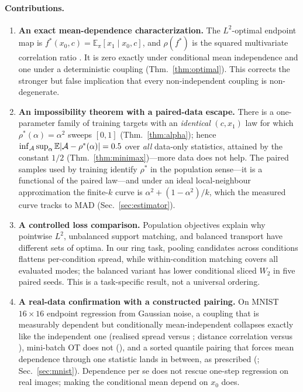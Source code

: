 \documentclass{article}
\theoremstyle{plain}
\newcommand{\Eop}{\mathbb{E}}
\begin{document}
\paragraph{Contributions.}
\begin{enumerate}
\item[\textbf{C1}] \textbf{An exact mean-dependence characterization.} The $L^2$-optimal
endpoint map is $f^\ast(x_0,c)=\Eop_\pi[x_1\mid x_0,c]$, and $\rho(f^\ast)$ is the
squared multivariate correlation ratio \citep{renyi1959,sampson1984}. It is zero exactly
under conditional mean independence and one under a deterministic coupling
(Thm.~\ref{thm:optimal}). This corrects the stronger but false implication that every
non-independent coupling is non-degenerate.
\item[\textbf{C2}] \textbf{An impossibility theorem with a paired-data escape.} There is a
one-parameter family of training targets with an \emph{identical} $(c,x_1)$ law for
which $\rho^\ast(\alpha)=\alpha^2$ sweeps $[0,1]$ (Thm.~\ref{thm:alpha}); hence
$\inf_{\mathcal A}\sup_\alpha\Eop|\mathcal A-\rho^\ast(\alpha)|=\MinimaxConst$ over
\emph{all} data-only statistics, attained by the constant $1/2$
(Thm.~\ref{thm:minimax})---more data does not help. The paired samples used by
training identify $\rho^\ast$ in the population sense---it is a functional of the paired
law---and under an ideal local-neighbour approximation the finite-$k$ curve is
$\alpha^2+(1-\alpha^2)/k$, which the measured curve tracks to MAD \ImpPredMad{}
(Sec.~\ref{sec:estimator}).
\item[\textbf{C3}] \textbf{A controlled loss comparison.} Population objectives explain
why pointwise $L^2$, unbalanced support matching, and balanced transport have different
sets of optima. In our ring task, pooling candidates across conditions flattens
per-condition spread, while within-condition matching covers all evaluated modes; the
balanced variant has lower conditional sliced $W_2$ in five paired seeds. This is a
task-specific result, not a universal ordering.
\item[\textbf{C4}] \textbf{A real-data confirmation with a constructed pairing.} On MNIST
$16{\times}16$ endpoint regression from Gaussian noise, a coupling that is measurably
dependent but conditionally mean-independent collapses exactly like the independent one
(realised spread \MnistBRhoTr{} versus \MnistARhoTr{}; distance correlation
\MnistBDcor{} versus \MnistADcor{}), mini-batch OT does not (\MnistCRhoTr{}), and a
sorted quantile pairing that forces mean dependence through one statistic lands in
between, as prescribed (\MnistDRhoTr{}; Sec.~\ref{sec:mnist}). Dependence per se
does not rescue one-step regression on real images; making the conditional mean
depend on $x_0$ does.
\end{enumerate}
\end{document}
